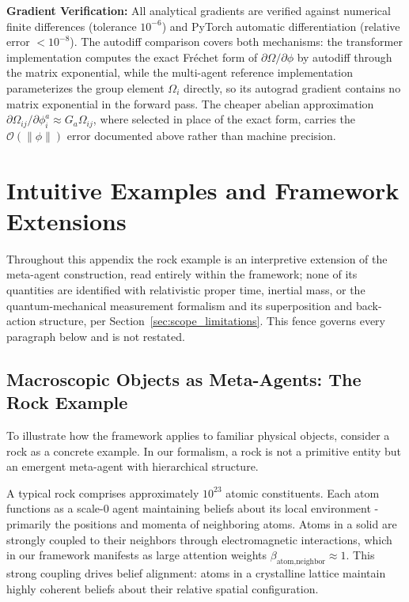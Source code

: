 \documentclass[11pt]{article}
\begin{document}
\textbf{Gradient Verification:} All analytical gradients are verified against numerical finite differences (tolerance $10^{-6}$) and PyTorch automatic differentiation (relative error $< 10^{-8}$). The autodiff comparison covers both mechanisms: the transformer implementation computes the exact Fr\'echet form of $\partial\Omega/\partial\phi$ by autodiff through the matrix exponential, while the multi-agent reference implementation parameterizes the group element $\Omega_i$ directly, so its autograd gradient contains no matrix exponential in the forward pass. The cheaper abelian approximation $\partial\Omega_{ij}/\partial\phi_i^a \approx G_a\Omega_{ij}$, where selected in place of the exact form, carries the $\mathcal{O}(\|\phi\|)$ error documented above rather than machine precision.

\section{Intuitive Examples and Framework Extensions}
\label{app:examples}

Throughout this appendix the rock example is an interpretive extension of the meta-agent construction, read entirely within the framework; none of its quantities are identified with relativistic proper time, inertial mass, or the quantum-mechanical measurement formalism and its superposition and back-action structure, per Section~\ref{sec:scope_limitations}. This fence governs every paragraph below and is not restated.

\subsection{Macroscopic Objects as Meta-Agents: The Rock Example}

To illustrate how the framework applies to familiar physical objects, consider a rock as a concrete example. In our formalism, a rock is not a primitive entity but an emergent meta-agent with hierarchical structure.

A typical rock comprises approximately $10^{23}$ atomic constituents. Each atom functions as a scale-0 agent maintaining beliefs about its local environment - primarily the positions and momenta of neighboring atoms. Atoms in a solid are strongly coupled to their neighbors through electromagnetic interactions, which in our framework manifests as large attention weights $\beta_{\text{atom,neighbor}} \approx 1$. This strong coupling drives belief alignment: atoms in a crystalline lattice maintain highly coherent beliefs about their relative spatial configuration.
\end{document}
